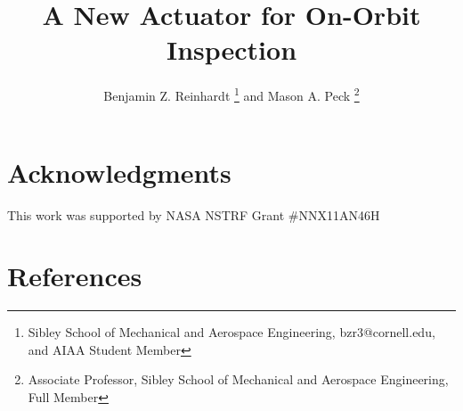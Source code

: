 \documentclass{AIAA}
\begin{document}
\title{A New Actuator for On-Orbit Inspection}
\author{Benjamin Z. Reinhardt \footnote{Sibley School of Mechanical and Aerospace Engineering, bzr3@cornell.edu, and AIAA Student Member} and Mason A. Peck \footnote{Associate Professor, Sibley School of Mechanical and Aerospace Engineering, Full Member}}

 

\maketitle












\section*{Acknowledgments}
This work was supported by NASA NSTRF Grant \#NNX11AN46H %
\section*{References}


\end{document}
